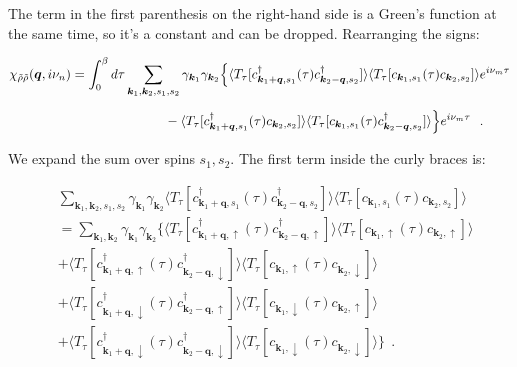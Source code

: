 \documentclass[a4j]{jsarticle}
\begin{document}
The term in the first parenthesis on the right-hand side is a Green's function at the same time, so it's a constant and can be dropped.
Rearranging the signs:

\begin{align}
	\chi_{\tilde{\rho} \tilde{\rho}}(\bm{q},i \nu_{n})
	 & =
	\int^{\beta}_{0} d \tau
	\sum_{\bm{k}_{1} , \bm{k}_{2} , s_{1} ,s_{2} }
	\gamma_{\bm{k}_{1}}
	\gamma_{\bm{k}_{2}}
	\Big\{
	\langle T_{\tau} [
			c_{ \bm{k}_{1}+\bm{q} , s_{1} }^{\dagger} (\tau)
			c_{ \bm{k}_{2}-\bm{q} , s_{2} }^{\dagger}
		] \rangle
	\langle T_{\tau} [
			c_{ \bm{k}_{1} , s_{1} } (\tau)
			c_{ \bm{k}_{2} , s_{2} }
		] \rangle
	e^{i \nu_{m} \tau}
	\nonumber          \\[2mm]
	 & \hspace{25mm} -
	\langle T_{\tau} [
			c_{ \bm{k}_{1}+\bm{q} , s_{1} }^{\dagger} (\tau)
			c_{ \bm{k}_{2} , s_{2} }
		] \rangle
	\langle T_{\tau} [
			c_{ \bm{k}_{1} , s_{1} } (\tau)
			c_{ \bm{k}_{2}-\bm{q} , s_{2} }^{\dagger}
		] \rangle
	\Big\}
	e^{i \nu_{m} \tau}
	\ \ .
	\label{eqn:timeintegralbefore141125}
\end{align}

We expand the sum over spins $s_{1},s_{2}$.
The first term inside the curly braces is:

\begin{align}
	 &
	\sum_{\bm{k}_{1} , \bm{k}_{2} , s_{1} ,s_{2} }
	\gamma_{\bm{k}_{1}}
	\gamma_{\bm{k}_{2}}
	\langle T_{\tau} [
			c_{ \bm{k}_{1}+\bm{q} , s_{1} }^{\dagger} (\tau)
			c_{ \bm{k}_{2}-\bm{q} , s_{2} }^{\dagger}
		] \rangle
	\langle T_{\tau} [
			c_{ \bm{k}_{1} , s_{1} } (\tau)
			c_{ \bm{k}_{2} , s_{2} }
		] \rangle
	\\ &=
	\sum_{\bm{k}_{1} , \bm{k}_{2} }
	\gamma_{\bm{k}_{1}}
	\gamma_{\bm{k}_{2}}
	\Big\{
	\langle T_{\tau} [
			c_{ \bm{k}_{1}+\bm{q} , \uparrow }^{\dagger} (\tau)
			c_{ \bm{k}_{2}-\bm{q} , \uparrow }^{\dagger}
		] \rangle
	\langle T_{\tau} [
			c_{ \bm{k}_{1} , \uparrow } (\tau)
			c_{ \bm{k}_{2} , \uparrow }
		] \rangle
	\nonumber \\ &+
	\langle T_{\tau} [
			c_{ \bm{k}_{1}+\bm{q} , \uparrow }^{\dagger} (\tau)
			c_{ \bm{k}_{2}-\bm{q} , \downarrow }^{\dagger}
		] \rangle
	\langle T_{\tau} [
			c_{ \bm{k}_{1} , \uparrow } (\tau)
			c_{ \bm{k}_{2} , \downarrow }
		] \rangle
	\nonumber \\[2mm] &+
	\langle T_{\tau} [
			c_{ \bm{k}_{1}+\bm{q} , \downarrow }^{\dagger} (\tau)
			c_{ \bm{k}_{2}-\bm{q} , \uparrow }^{\dagger}
		] \rangle
	\langle T_{\tau} [
			c_{ \bm{k}_{1} , \downarrow } (\tau)
			c_{ \bm{k}_{2} , \uparrow }
		] \rangle
	\nonumber \\[2mm] &+
	\langle T_{\tau} [
			c_{ \bm{k}_{1}+\bm{q} , \downarrow }^{\dagger} (\tau)
			c_{ \bm{k}_{2}-\bm{q} , \downarrow }^{\dagger}
		] \rangle
	\langle T_{\tau} [
			c_{ \bm{k}_{1} , \downarrow } (\tau)
			c_{ \bm{k}_{2} , \downarrow }
		] \rangle
	\Big\}
	\ \ .
\end{align}
\end{document}
